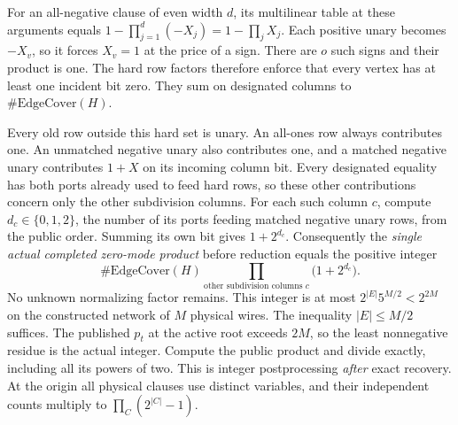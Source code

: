 \documentclass[
  11pt,
]{article}
\begin{document}
For an all-negative clause of even width \(d\), its multilinear table at
these arguments equals \(1-\prod_{j=1}^d(-X_j)=1-\prod_j X_j\). Each
positive unary becomes \(-X_v\), so it forces \(X_v=1\) at the price of
a sign. There are \(o\) such signs and their product is one. The hard
row factors therefore enforce that every vertex has at least one
incident bit zero. They sum on designated columns to
\(\#\mathrm{EdgeCover}(H)\).

Every old row outside this hard set is unary. An all-ones row always
contributes one. An unmatched negative unary also contributes one, and a
matched negative unary contributes \(1+X\) on its incoming column bit.
Every designated equality has both ports already used to feed hard rows,
so these other contributions concern only the other subdivision columns.
For each such column \(c\), compute \(d_c\in\{0,1,2\}\), the number of
its ports feeding matched negative unary rows, from the public order.
Summing its own bit gives \(1+2^{d_c}\). Consequently the \emph{single
actual completed zero-mode product} before reduction equals the positive
integer \[
    \#\mathrm{EdgeCover}(H)\prod_{\text{other subdivision columns }c}
                                   \bigl(1+2^{d_c}\bigr).
\tag{A6}
\] No unknown normalizing factor remains. This integer is at most
\(2^{|E|}5^{M/2}<2^{2M}\) on the constructed network of \(M\) physical
wires. The inequality \(|E|\le M/2\) suffices. The published \(p_t\) at
the active root exceeds \(2M\), so the least nonnegative residue is the
actual integer. Compute the public product and divide exactly, including
all its powers of two. This is integer postprocessing \emph{after} exact
recovery. At the origin all physical clauses use distinct variables, and
their independent counts multiply to \(\prod_C (2^{|C|}-1)\).
\end{document}
